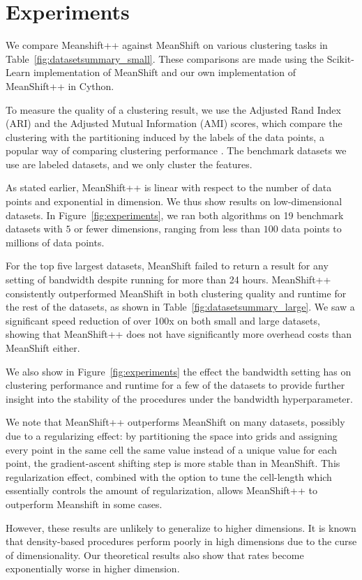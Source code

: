 \section{Experiments}
We compare Meanshift++ against MeanShift on various clustering tasks in Table~\ref{fig:datasetsummary_small}. These comparisons are made using the Scikit-Learn \cite{pedregosa2011scikit} implementation of MeanShift and our own implementation of MeanShift++ in Cython.

To measure the quality of a clustering result, we use the Adjusted Rand Index (ARI) \cite{hubert1985comparing} and the Adjusted Mutual Information (AMI) \cite{vinh2010information} scores, which compare the clustering with the partitioning induced by the labels of the data points, a popular way of comparing clustering performance \cite{jang2019dbscan++}. The benchmark datasets we use are labeled datasets, and we only cluster the features. 

As stated earlier, MeanShift++ is linear with respect to the number of data points and exponential in dimension. We thus show results on low-dimensional datasets. In Figure~\ref{fig:experiments}, we ran both algorithms on 19 benchmark datasets with $5$ or fewer dimensions, ranging from less than $100$ data points to millions of data points.

For the top five largest datasets, MeanShift failed to return a result for any setting of bandwidth despite running for more than 24 hours. MeanShift++ consistently outperformed MeanShift in both clustering quality and runtime for the rest of the datasets, as shown in Table~\ref{fig:datasetsummary_large}. We saw a significant speed reduction of over 100x on both small and large datasets, showing that MeanShift++ does not have significantly more overhead costs than MeanShift either. 

We also show in Figure~\ref{fig:experiments} the effect the bandwidth setting has on clustering performance and runtime for a few of the datasets to provide further insight into the stability of the procedures under the bandwidth hyperparameter.

We note that MeanShift++ outperforms MeanShift on many datasets, possibly due to a regularizing effect: by partitioning the space into grids and assigning every point in the same cell the same value instead of a unique value for each point, the gradient-ascent shifting step is more stable than in MeanShift. This regularization effect, combined with the option to tune the cell-length which essentially controls the amount of regularization, allows MeanShift++ to outperform Meanshift in some cases. 

However, these results are unlikely to generalize to higher dimensions. It is known that density-based procedures perform poorly in high dimensions due to the curse of dimensionality. Our theoretical results also show that rates become exponentially worse in higher dimension. 